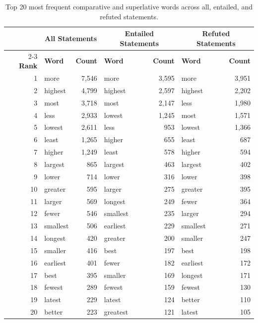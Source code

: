 \begin{table}[ht]
\centering
\small
\begin{tabular}{r l r l r l r}
\hline
 & \multicolumn{2}{c}{\textbf{All Statements}} & \multicolumn{2}{c}{\textbf{Entailed Statements}} & \multicolumn{2}{c}{\textbf{Refuted Statements}} \\
\cline{2-3} \cline{4-5} \cline{6-7}
\textbf{Rank} & \textbf{Word} & \textbf{Count} & \textbf{Word} & \textbf{Count} & \textbf{Word} & \textbf{Count} \\
\hline
1  & more     & 7,546 & more     & 3,595 & more     & 3,951 \\
2  & highest  & 4,799 & highest  & 2,597 & highest  & 2,202 \\
3  & most     & 3,718 & most     & 2,147 & less     & 1,980 \\
4  & less     & 2,933 & lowest   & 1,245 & most     & 1,571 \\
5  & lowest   & 2,611 & less     & 953   & lowest   & 1,366 \\
6  & least    & 1,265 & higher   & 655   & least    & 687   \\
7  & higher   & 1,249 & least    & 578   & higher   & 594   \\
8  & largest  & 865   & largest  & 463   & largest  & 402   \\
9  & lower    & 714   & lower    & 316   & lower    & 398   \\
10 & greater  & 595   & larger   & 275   & greater  & 395   \\
11 & larger   & 569   & longest  & 249   & fewer    & 364   \\
12 & fewer    & 546   & smallest & 235   & larger   & 294   \\
13 & smallest & 506   & earliest & 229   & smallest & 271   \\
14 & longest  & 420   & greater  & 200   & smaller  & 247   \\
15 & smaller  & 416   & best     & 197   & best     & 198   \\
16 & earliest & 401   & fewer    & 182   & earliest & 172   \\
17 & best     & 395   & smaller  & 169   & longest  & 171   \\
18 & fewest   & 289   & fewest   & 159   & fewest   & 130   \\
19 & latest   & 229   & latest   & 124   & better   & 110   \\
20 & better   & 223   & greatest & 121   & latest   & 105   \\
\hline
\end{tabular}
\caption{Top 20 most frequent comparative and superlative words across all, entailed, and refuted statements.}
\label{tab:tabfact_top_20_comparatives}
\end{table}